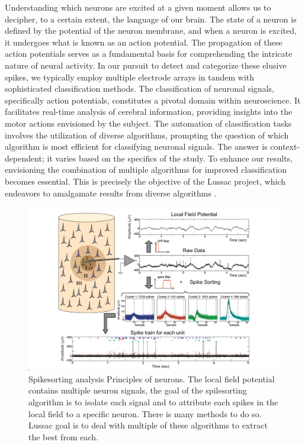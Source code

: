 \documentclass[11pt,a4paper]{report}
\begin{document}
\begin{center}
\begin{minipage}{.75\linewidth}
        Understanding which neurons are excited at a given moment allows us to decipher, to a certain extent, the language of our brain. The state of a neuron is defined by the potential of the neuron membrane, and when a neuron is excited, it undergoes what is known as an action potential. The propagation of these action potentials serves as a fundamental basis for comprehending the intricate nature of neural activity.
        In our pursuit to detect and categorize these elusive spikes, we typically employ multiple electrode arrays in tandem with sophisticated classification methods. The classification of neuronal signals, specifically action potentials, constitutes a pivotal domain within neuroscience. It facilitates real-time analysis of cerebral information, providing insights into the motor actions envisioned by the subject. The automation of classification tasks involves the utilization of diverse algorithms, prompting the question of which algorithm is most efficient for classifying neuronal signals. The answer is context-dependent; it varies based on the specifics of the study.
        To enhance our results, envisioning the combination of multiple algorithms for improved classification becomes essential. This is precisely the objective of the Lussac project, which endeavors to amalgamate results from diverse algorithms \cite{Kilosort}.

    \end{minipage}

    \begin{minipage}{.75\linewidth}
        \begin{figure}[H]
            \begin{center}
                \hspace*{-1cm}\includegraphics[width=1.2\linewidth]{./figure/spike.png}
            \end{center}
            \caption{Spikesorting analysis Principles of neurons. The local field potential contains multiple neuron signals, the goal of the spilesorting algorithm is to
                isolate each signal and to attribute each spikes in the local field to a specific neuron. There is many methods to do so. Lussac goal is to deal with multiple of these algorithms to extract the best from each.}
            \label{fig:}
        \end{figure}


\end{minipage}
\end{center}
\end{document}
